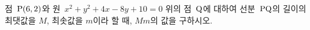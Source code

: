 점~$\mathrm{P}(6{,}\mkern3mu\mathopen{}2)$와 원~$x^2+y^2+4x-8y+10=0$ 위의 점~$\mathrm{Q}$에 대하여 선분~$\mathrm{PQ}$의 길이의 최댓값을 $M$, 최솟값을 $m$이라 할 때, $Mm$의 값을 구하시오.
